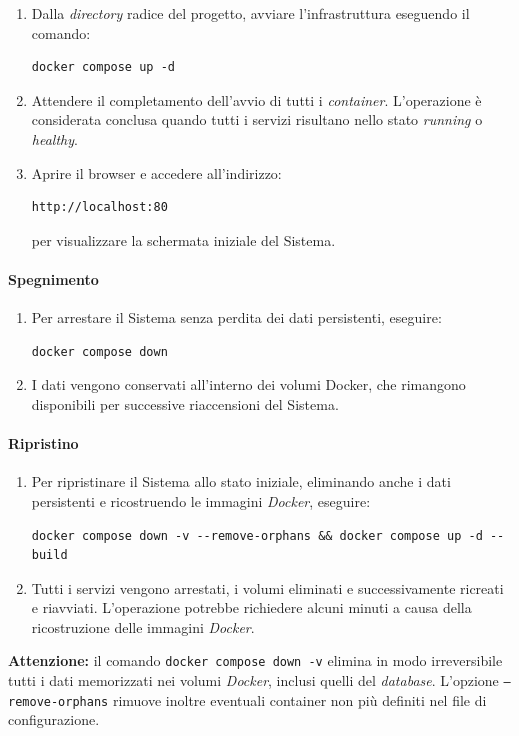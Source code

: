 \documentclass[10pt, letterpaper]{article}
\begin{document}
\begin{enumerate}
    \item Dalla \textit{directory} radice del progetto, avviare l'infrastruttura eseguendo il comando:
\begin{verbatim}
docker compose up -d
\end{verbatim}

    \item Attendere il completamento dell'avvio di tutti i \textit{container}. L'operazione è considerata conclusa quando tutti i servizi risultano nello stato \textit{running} o \textit{healthy}.

    \item Aprire il browser e accedere all'indirizzo:
\begin{verbatim}
http://localhost:80
\end{verbatim}
per visualizzare la schermata iniziale del Sistema.
\end{enumerate}

\paragraph{Spegnimento}

\begin{enumerate}
    \item Per arrestare il Sistema senza perdita dei dati persistenti, eseguire:
\begin{verbatim}
docker compose down
\end{verbatim}

    \item I dati vengono conservati all'interno dei volumi Docker, che rimangono disponibili per successive riaccensioni del Sistema.
\end{enumerate}

\paragraph{Ripristino}

\begin{enumerate}
    \item Per ripristinare il Sistema allo stato iniziale, eliminando anche i dati persistenti e ricostruendo le immagini \textit{Docker}, eseguire:
\begin{verbatim}
docker compose down -v --remove-orphans && docker compose up -d --build
\end{verbatim}

    \item Tutti i servizi vengono arrestati, i volumi eliminati e successivamente ricreati e riavviati. L'operazione potrebbe richiedere alcuni minuti a causa della ricostruzione delle immagini \textit{Docker}.
\end{enumerate}
\textbf{Attenzione:} il comando \texttt{docker compose down -v} elimina in modo irreversibile tutti i dati memorizzati nei volumi \textit{Docker}, inclusi quelli del \textit{database}. 
L'opzione \texttt{--remove-orphans} rimuove inoltre eventuali container non più definiti nel file di configurazione.
\end{document}
